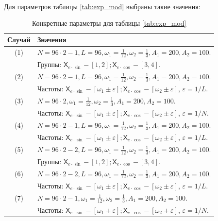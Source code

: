 \documentclass[12pt, specialist, subf
]{disser}
\theoremstyle{definition}
\newcommand{\TS}{\mathsf{X}}
\begin{document}
Для параметров таблицы \ref{tab:exp_mod} выбраны такие значения:


\begin{table}[H]
    \caption{Конкретные параметры для таблицы \ref{tab:exp_mod}}
    \centering
    \label{tab:exp_mod_parameters}
    \begin{tabularx}{\textwidth}{|c|X|} %
        \hline
        Случай & Значения \\
        \hline
		\hline
        (1) & $N = 96 \cdot 2-1, L = 96, \omega_1 = \frac{1}{12}, \omega_2 = \frac{1}{3}, A_1 = 200, A_2 = 100$. \\
            & Группы: $\TS_{e\cdot\sin} - [1,2]; \TS_{e\cdot\cos} - [3,4]$. \\
        \hline
        (2) & $N = 96 \cdot 2-1, L = 96, \omega_1 = \frac{1}{12}, \omega_2 = \frac{1}{3}, A_1 = 200, A_2 = 100$. \\
            & Частоты: $\TS_{e\cdot\sin} - [\omega_1 \pm \varepsilon]; \TS_{e\cdot\cos} - [\omega_2 \pm \varepsilon]$, $\varepsilon = 1/L$. \\
        \hline
        (3) & $N = 96 \cdot 2, \omega_1 = \frac{1}{12}, \omega_2 = \frac{1}{3}, A_1 = 200, A_2 = 100$. \\
            & Частоты: $\TS_{e\cdot\sin} - [\omega_1 \pm \varepsilon]; \TS_{e\cdot\cos} - [\omega_2 \pm \varepsilon]$, $\varepsilon = 1/N$. \\
        \hline
        (4) & $N = 96 \cdot 2-1, L = 96, \omega_1 = \frac{1}{12}, \omega_2 = \frac{1}{3}, A_1 = 200, A_2 = 100$. \\
            & Частоты: $\TS_{e\cdot\sin} - [\omega_1 \pm \varepsilon]; \TS_{e\cdot\cos} - [\omega_2 \pm \varepsilon]$, $\varepsilon = 1/L$. \\
        \hline
        \hline
        (5) & $N = 96 \cdot 2-2, L = 96, \omega_1 = \frac{1}{12}, \omega_2 = \frac{1}{3}, A_1 = 200, A_2 = 100$. \\
            & Группы: $\TS_{e\cdot\sin} - [1,2]; \TS_{e\cdot\cos} - [3,4]$. \\
        \hline
        (6) & $N = 96 \cdot 2-2, L = 96, \omega_1 = \frac{1}{12}, \omega_2 = \frac{1}{3}, A_1 = 200, A_2 = 100$. \\
            & Частоты: $\TS_{e\cdot\sin} - [\omega_1 \pm \varepsilon]; \TS_{e\cdot\cos} - [\omega_2 \pm \varepsilon]$, $\varepsilon = 1/L$. \\
        \hline
        (7) & $N = 96 \cdot 2-1, \omega_1 = \frac{1}{12}, \omega_2 = \frac{1}{3}, A_1 = 200, A_2 = 100$. \\
            & Частоты: $\TS_{e\cdot\sin} - [\omega_1 \pm \varepsilon]; \TS_{e\cdot\cos} - [\omega_2 \pm \varepsilon]$, $\varepsilon = 1/N$. \\
        \hline
    \end{tabularx}
\end{table}
\end{document}
